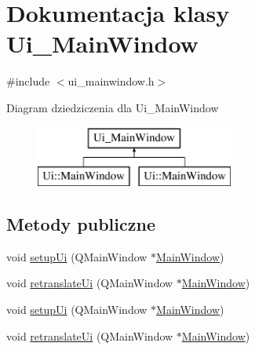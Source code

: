 \hypertarget{classUi__MainWindow}{\section{Dokumentacja klasy Ui\-\_\-\-Main\-Window}
\label{classUi__MainWindow}
}


{\ttfamily \#include $<$ui\-\_\-mainwindow.\-h$>$}

Diagram dziedziczenia dla Ui\-\_\-\-Main\-Window\begin{figure}[H]
\begin{center}
\leavevmode
\includegraphics[height=2.000000cm]{d5/d3f/classUi__MainWindow}
\end{center}
\end{figure}
\subsection*{Metody publiczne}
\begin{DoxyCompactItemize}
\item 
void \hyperlink{classUi__MainWindow_acf4a0872c4c77d8f43a2ec66ed849b58}{setup\-Ui} (Q\-Main\-Window $\ast$\hyperlink{classMainWindow}{Main\-Window})
\item 
void \hyperlink{classUi__MainWindow_a097dd160c3534a204904cb374412c618}{retranslate\-Ui} (Q\-Main\-Window $\ast$\hyperlink{classMainWindow}{Main\-Window})
\item 
void \hyperlink{classUi__MainWindow_acf4a0872c4c77d8f43a2ec66ed849b58}{setup\-Ui} (Q\-Main\-Window $\ast$\hyperlink{classMainWindow}{Main\-Window})
\item 
void \hyperlink{classUi__MainWindow_a097dd160c3534a204904cb374412c618}{retranslate\-Ui} (Q\-Main\-Window $\ast$\hyperlink{classMainWindow}{Main\-Window})
\end{DoxyCompactItemize}
